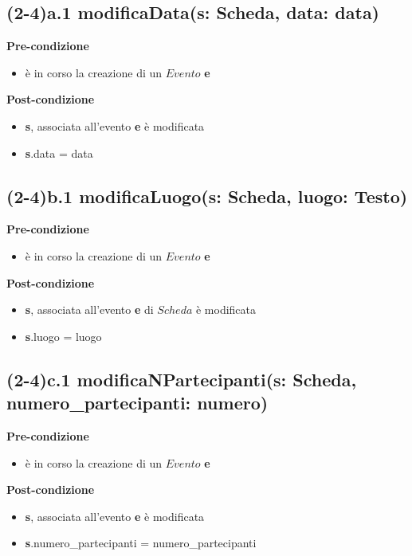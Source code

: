 \documentclass[12pt]{extarticle}
\begin{document}
\subsection*{(2-4)a.1 modificaData(s: Scheda, data: data)}

\textbf{Pre-condizione}
\begin{itemize}
  \item è in corso la creazione di un $Evento$ \textbf{e}
\end{itemize} 
\textbf{Post-condizione}
\begin{itemize}
  \item \textbf{s}, associata all'evento \textbf{e} è modificata
  \item \textbf{s}.data = data
\end{itemize} 

\subsection*{(2-4)b.1 modificaLuogo(s: Scheda, luogo: Testo)}

\textbf{Pre-condizione}
\begin{itemize}
  \item è in corso la creazione di un $Evento$ \textbf{e}
\end{itemize} 
\textbf{Post-condizione}
\begin{itemize}
  \item \textbf{s}, associata all'evento \textbf{e} di $Scheda$ è modificata
  \item \textbf{s}.luogo = luogo
\end{itemize} 


\subsection*{(2-4)c.1 modificaNPartecipanti(s: Scheda, numero\_partecipanti: numero)}
\textbf{Pre-condizione}
\begin{itemize}
  \item è in corso la creazione di un $Evento$ \textbf{e}
\end{itemize} 
\textbf{Post-condizione}
\begin{itemize}
  \item \textbf{s}, associata all'evento \textbf{e} è modificata
  \item \textbf{s}.numero\_partecipanti = numero\_partecipanti
\end{itemize}
\end{document}
